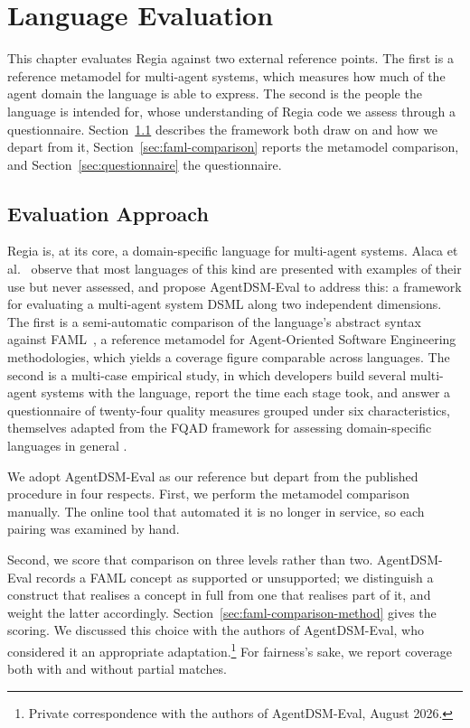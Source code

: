 \chapter{Language Evaluation}
\label{ch:evaluation}

This chapter evaluates Regia against two external reference points. The first is a reference metamodel for multi-agent systems, which measures how much of the agent domain the language is able to express. The second is the people the language is intended for, whose understanding of Regia code we assess through a questionnaire. Section~\ref{sec:evaluation-approach} describes the framework both draw on and how we depart from it, Section~\ref{sec:faml-comparison} reports the metamodel comparison, and Section~\ref{sec:questionnaire} the questionnaire. 

\section{Evaluation Approach}
\label{sec:evaluation-approach}
 
Regia is, at its core, a domain-specific language for multi-agent systems. Alaca et al.~\cite{Alaca2021} observe that most languages of this kind are presented with examples of their use but never assessed, and propose AgentDSM-Eval to address this: a framework for evaluating a multi-agent system DSML along two independent dimensions. The first is a semi-automatic comparison of the language's abstract syntax against FAML~\cite{Beydoun2009}, a reference metamodel for Agent-Oriented Software Engineering methodologies, which yields a coverage figure comparable across languages. The second is a multi-case empirical study, in which developers build several multi-agent systems with the language, report the time each stage took, and answer a questionnaire of twenty-four quality measures grouped under six characteristics, themselves adapted from the FQAD framework for assessing domain-specific languages in general \cite{Kahraman2015}.
 
We adopt AgentDSM-Eval as our reference but depart from the published procedure in four respects. First, we perform the metamodel comparison manually. The online tool that automated it is no longer in service, so each pairing was examined by hand.
 
Second, we score that comparison on three levels rather than two. AgentDSM-Eval records a FAML concept as supported or unsupported; we distinguish a construct that realises a concept in full from one that realises part of it, and weight the latter accordingly. Section~\ref{sec:faml-comparison-method} gives the scoring. We discussed this choice with the authors of AgentDSM-Eval, who considered it an appropriate adaptation.\footnote{Private correspondence with the authors of AgentDSM-Eval, August 2026.} For fairness's sake, we report coverage both with and without partial matches.
 
